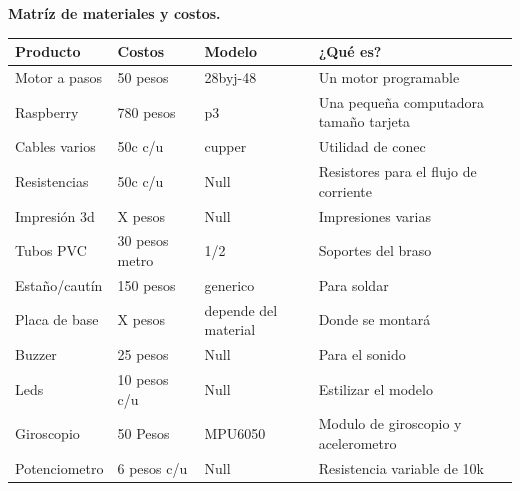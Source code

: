 \documentclass[letterpaper]{article}
\begin{document}
   \begin{large}
       \begin{large}
       \textbf{Matríz de materiales y costos.}
           \begin{table}[htbp]
\begin{tabular}{|l|l|l|l|} 
\hline
Producto      & Costos         & Modelo               & ¿Qué es?                               \\ \hline
Motor a pasos & 50 pesos       & 28byj-48             & Un motor programable                   \\ \hline
Raspberry     & 780 pesos      & p3                   & Una pequeña computadora tamaño tarjeta \\ \hline
Cables varios & 50c c/u        & cupper               & Utilidad de conec                      \\ \hline
Resistencias  & 50c c/u        & Null                 & Resistores para el flujo de corriente  \\ \hline
Impresión 3d  & X pesos        & Null                 & Impresiones varias                     \\ \hline
Tubos PVC     & 30 pesos metro & 1/2                  & Soportes del braso                     \\ \hline
Estaño/cautín & 150 pesos      & generico             & Para soldar                            \\ \hline
Placa de base & X pesos        & depende del material & Donde se montará                       \\ \hline
Buzzer        & 25 pesos       & Null                 & Para el sonido                         \\ \hline
Leds          & 10 pesos c/u   & Null                 & Estilizar el modelo                     \\ \hline
Giroscopio    & 50 Pesos       & MPU6050              & Modulo de giroscopio y acelerometro    \\ \hline
Potenciometro & 6 pesos c/u    & Null                 & Resistencia variable de 10k            \\ \hline
\end{tabular}
\end{table}
       \end{large}
   \end{large}
\\\\
\end{document}
